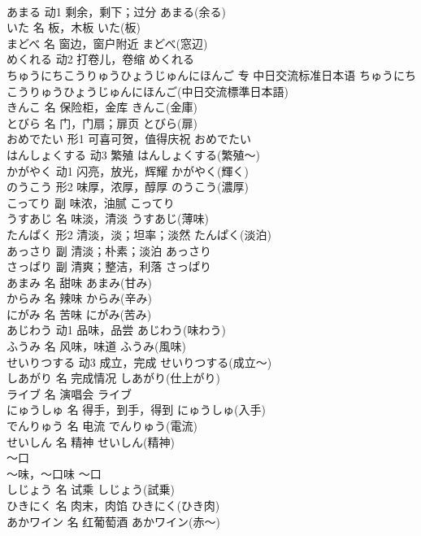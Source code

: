 \documentclass[8pt]{extreport}
\begin{document}
\begin{CJK}{UTF8}{min}
\\	あまる	动1	剩余，剩下；过分	あまる(余る)	
\\	いた	名	板，木板	いた(板)	
\\	まどべ	名	窗边，窗户附近	まどべ(窓辺)	
\\	めくれる	动2	打卷儿，卷缩	めくれる	
\\	ちゅうにちこうりゅうひょうじゅんにほんご	专	中日交流标准日本语	ちゅうにちこうりゅうひょうじゅんにほんご(中日交流標準日本語)	
\\	きんこ	名	保险柜，金库	きんこ(金庫)	
\\	とびら	名	门，门扇；扉页	とびら(扉)	
\\	おめでたい	形1	可喜可贺，值得庆祝	おめでたい	
\\	はんしょくする	动3	繁殖	はんしょくする(繁殖～)	
\\	かがやく	动1	闪亮，放光，辉耀	かがやく(輝く)	
\\	のうこう	形2	味厚，浓厚，醇厚	のうこう(濃厚)	
\\	こってり	副	味浓，油腻	こってり	
\\	うすあじ	名	味淡，清淡	うすあじ(薄味)	
\\	たんぱく	形2	清淡，淡；坦率；淡然	たんぱく(淡泊)	
\\	あっさり	副	清淡；朴素；淡泊	あっさり	
\\	さっぱり	副	清爽；整洁，利落	さっぱり	
\\	あまみ	名	甜味	あまみ(甘み)	
\\	からみ	名	辣味	からみ(辛み)	
\\	にがみ	名	苦味	にがみ(苦み)	
\\	あじわう	动1	品味，品尝	あじわう(味わう)	
\\	ふうみ	名	风味，味道	ふうみ(風味)	
\\	せいりつする	动3	成立，完成	せいりつする(成立～)	
\\	しあがり	名	完成情况	しあがり(仕上がり)	
\\	ライブ	名	演唱会	ライブ	
\\	にゅうしゅ	名	得手，到手，得到	にゅうしゅ(入手)	
\\	でんりゅう	名	电流	でんりゅう(電流)	
\\	せいしん	名	精神	せいしん(精神)	
\\	～口	
\\	～味，～口味	～口	
\\	しじょう	名	试乘	しじょう(試乗)	
\\	ひきにく	名	肉末，肉馅	ひきにく(ひき肉)	
\\	あかワイン	名	红葡萄酒	あかワイン(赤～)	

\end{CJK}
\end{document}
